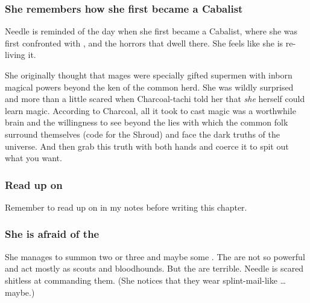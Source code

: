 \subsubsection{She remembers how she first became a Cabalist}
Needle is reminded of the day when she first became a Cabalist, where she was first confronted with \itzach, \Nyx{} and the horrors that dwell there. 
She feels like she is re-living it. 


She originally thought that mages were specially gifted supermen with inborn magical powers beyond the ken of the common herd. 
She was wildly surprised and more than a little scared when Charcoal-tachi told her that \emph{she} herself could learn magic. 
According to Charcoal, all it took to cast magic was a worthwhile brain and the willingness to see beyond the lies with which the common folk surround themselves (code for the Shroud) and face the dark truths of the universe. 
And then grab this truth with both hands and coerce it to spit out what you want. 





\subsubsection{Read up on \banes}
Remember to read up on \banes{} in my notes before writing this chapter. 





\subsubsection{She is afraid of the \banes}
She manages to summon two or three \lesserbanes{} and maybe some \banerats. 
The \banerats{} are not so powerful and act mostly as scouts and bloodhounds. 
But the \banes{} are terrible. 
Needle is scared shitless at commanding them. 
(She notices that they wear splint-mail-like \armour\ldots{} maybe.)

